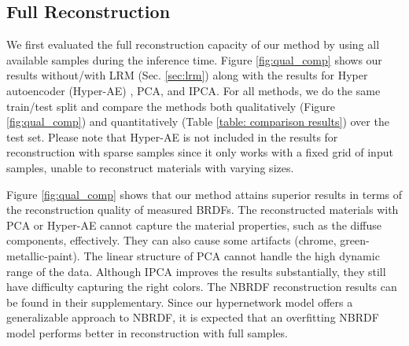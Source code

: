 \subsection{Full Reconstruction}\label{sec:full_rec}

We first evaluated the full reconstruction capacity of our method by using all available samples during the inference time. Figure \ref{fig:qual_comp} shows our results without/with LRM (Sec. \ref{sec:lrm}) along with the results for Hyper autoencoder (Hyper-AE) \cite{sztrajman2021neural}, PCA, and IPCA. For all methods, we do the same train/test split and compare the methods both qualitatively (Figure \ref{fig:qual_comp}) and quantitatively (Table \ref{table: comparison results}) over the test set. Please note that Hyper-AE is not included in the results for reconstruction with sparse samples since it only works with a fixed grid of input samples, unable to reconstruct materials with varying sizes. 


Figure \ref{fig:qual_comp} shows that our method attains superior results in terms of the reconstruction quality of measured BRDFs. The reconstructed materials with PCA or Hyper-AE cannot capture the material properties, such as the diffuse components, effectively. They can also cause some artifacts (chrome, green-metallic-paint). The linear structure of PCA cannot handle the high dynamic range of the data. Although IPCA \cite{nielsen2015optimal} improves the results substantially, they still have difficulty capturing the right colors. The NBRDF \cite{sztrajman2021neural} reconstruction results can be found in their supplementary. Since our hypernetwork model offers a generalizable approach to NBRDF, it is expected that an overfitting NBRDF model performs better in reconstruction with full samples. 


